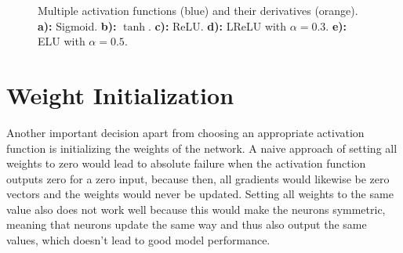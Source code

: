 \begin {figure}[!htb]
	\begin{center}
	\begin {subfigure}[b]{0.32\linewidth}
		\scalebox{0.65}{}
		\caption{}
	\end {subfigure}
	\begin {subfigure}[b]{0.32\linewidth}
		\scalebox{0.65}{}
		\caption{}
	\end {subfigure}
	\end{center}

	\begin {center}
	\begin {subfigure}[b]{0.32\linewidth}
		\scalebox{0.65}{}
		\caption{}
	\end {subfigure}
	\begin {subfigure}[b]{0.32\linewidth}
		\scalebox{0.65}{}
		\caption{}
	\end {subfigure}
	\begin {subfigure}[b]{0.32\linewidth}
		\scalebox{0.65}{}
		\caption{}
	\end {subfigure}
	\end{center}

		\caption[Multiple activation functions.]{Multiple activation functions (blue) and their derivatives (orange). \textbf{a):} Sigmoid. \textbf{b):} $\tanh$. \textbf{c):} ReLU. \textbf{d):} LReLU with $\alpha = 0.3$. \textbf{e):} ELU with $\alpha = 0.5$.}
		\label{fig:activation_functions}

\end {figure}



	\section{Weight Initialization}
\label{sec:weight_init}
Another important decision apart from choosing an appropriate activation function is initializing the weights of the network. A naive approach of setting all weights to zero would lead to absolute failure when the activation function outputs zero for a zero input, because then, all gradients would likewise be zero vectors and the weights would never be updated. Setting all weights to the same value also does not work well because this would make the neurons symmetric, meaning that neurons update the same way and thus also output the same values, which doesn't lead to good model performance.

